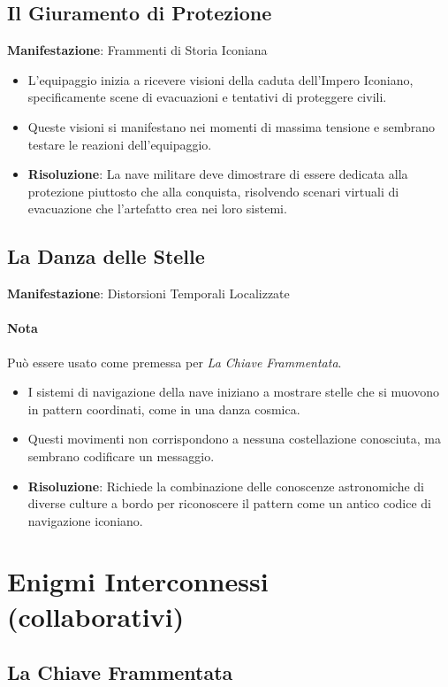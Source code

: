 \documentclass[letterpaper,twocolumn,openany,nodeprecatedcode]{dndbook}
\begin{document}
\subsection{Il Giuramento di Protezione}
\textbf{Manifestazione}: Frammenti di Storia Iconiana

\begin{itemize}
    \item L'equipaggio inizia a ricevere visioni della caduta dell'Impero Iconiano, specificamente scene di evacuazioni e tentativi di proteggere civili.
    \item Queste visioni si manifestano nei momenti di massima tensione e sembrano testare le reazioni dell'equipaggio.
    \item \textbf{Risoluzione}: La nave militare deve dimostrare di essere dedicata alla protezione piuttosto che alla conquista, risolvendo scenari virtuali di evacuazione che l'artefatto crea nei loro sistemi.
\end{itemize}

\subsection{La Danza delle Stelle}
\textbf{Manifestazione}: Distorsioni Temporali Localizzate
\paragraph{Nota} Può essere usato come premessa per \textit{La Chiave Frammentata}.

\begin{itemize}
    \item I sistemi di navigazione della nave iniziano a mostrare stelle che si muovono in pattern coordinati, come in una danza cosmica.
    \item Questi movimenti non corrispondono a nessuna costellazione conosciuta, ma sembrano codificare un messaggio.
    \item \textbf{Risoluzione}: Richiede la combinazione delle conoscenze astronomiche di diverse culture a bordo per riconoscere il pattern come un antico codice di navigazione iconiano.
\end{itemize}




\section{Enigmi Interconnessi (collaborativi)}
\subsection{La Chiave Frammentata}
\end{document}
